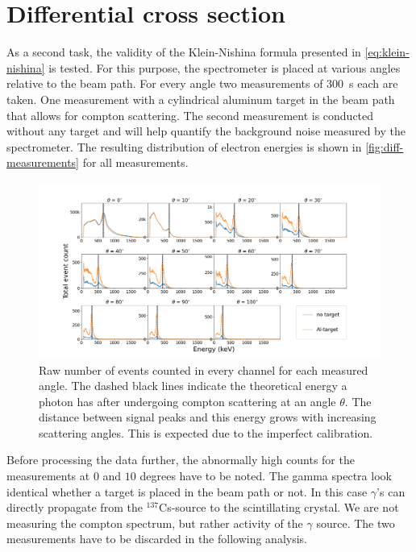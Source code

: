
\section{Differential cross section}
\label{sec:differential-cross-section}

As a second task, the validity of the Klein-Nishina formula presented in
\autoref{eq:klein-nishina} is tested. For this purpose, the spectrometer is placed 
at various angles relative to the beam path. For every angle two measurements of 
\SI{300}{\second} each are taken. One measurement with a cylindrical aluminum target 
in the beam path that allows for compton scattering. The second measurement is 
conducted without any target and will help quantify the background noise measured 
by the spectrometer. The resulting distribution of electron energies is shown in 
\autoref{fig:diff-measurements} for all measurements.

\begin{figure}
  \includegraphics[width=1.0\textwidth]{./fig/differential measurements.png}
\caption{Raw number of events counted in every channel for each measured angle.
  The dashed black lines indicate the theoretical energy a photon has after
  undergoing compton scattering at an angle $\theta$. The distance between signal
  peaks and this energy grows with increasing scattering angles. This is expected
  due to the imperfect calibration.}\label{fig:diff-measurements}
\end{figure}

Before processing the data further, the abnormally high counts for the measurements
at $0$ and $10$ degrees have to be noted. The gamma spectra look identical whether a 
target is placed in the beam path or not. In this case $\gamma$'s can directly 
propagate from the $^{137}$Cs-source to the scintillating crystal. We are not
measuring the compton spectrum, but rather activity of the $\gamma$ source. The two
measurements have to be discarded in the following analysis.

